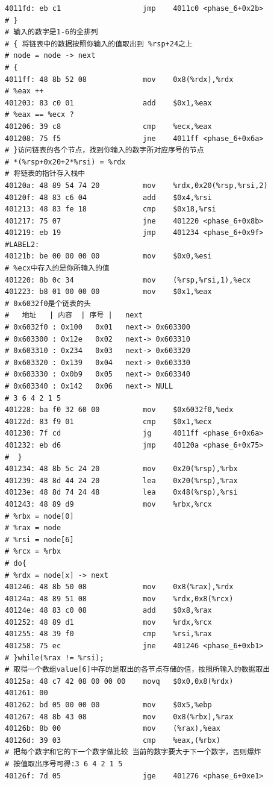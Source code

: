\begin{lstlisting}
4011fd:	eb c1                	jmp    4011c0 <phase_6+0x2b>
# } 
# 输入的数字是1-6的全排列
# { 将链表中的数据按照你输入的值取出到 %rsp+24之上
# node = node -> next
# {
4011ff:	48 8b 52 08          	mov    0x8(%rdx),%rdx
# %eax ++
401203:	83 c0 01             	add    $0x1,%eax
# %eax == %ecx ?
401206:	39 c8                	cmp    %ecx,%eax
401208:	75 f5                	jne    4011ff <phase_6+0x6a>
# }访问链表的各个节点，找到你输入的数字所对应序号的节点
# *(%rsp+0x20+2*%rsi) = %rdx
# 将链表的指针存入栈中
40120a:	48 89 54 74 20       	mov    %rdx,0x20(%rsp,%rsi,2)
40120f:	48 83 c6 04          	add    $0x4,%rsi
401213:	48 83 fe 18          	cmp    $0x18,%rsi
401217:	75 07                	jne    401220 <phase_6+0x8b>
401219:	eb 19                	jmp    401234 <phase_6+0x9f>
#LABEL2:
40121b:	be 00 00 00 00       	mov    $0x0,%esi
# %ecx中存入的是你所输入的值
401220:	8b 0c 34             	mov    (%rsp,%rsi,1),%ecx
401223:	b8 01 00 00 00       	mov    $0x1,%eax
# 0x6032f0是个链表的头
#   地址   | 内容  | 序号 |   next  
# 0x6032f0 : 0x100   0x01   next-> 0x603300
# 0x603300 : 0x12e   0x02   next-> 0x603310
# 0x603310 : 0x234   0x03   next-> 0x603320
# 0x603320 : 0x139   0x04   next-> 0x603330
# 0x603330 : 0x0b9   0x05   next-> 0x603340
# 0x603340 : 0x142   0x06   next-> NULL
# 3 6 4 2 1 5
401228:	ba f0 32 60 00       	mov    $0x6032f0,%edx
40122d:	83 f9 01             	cmp    $0x1,%ecx
401230:	7f cd                	jg     4011ff <phase_6+0x6a>
401232:	eb d6                	jmp    40120a <phase_6+0x75>
#  }
401234:	48 8b 5c 24 20       	mov    0x20(%rsp),%rbx
401239:	48 8d 44 24 20       	lea    0x20(%rsp),%rax
40123e:	48 8d 74 24 48       	lea    0x48(%rsp),%rsi
401243:	48 89 d9             	mov    %rbx,%rcx
# %rbx = node[0]
# %rax = node
# %rsi = node[6]
# %rcx = %rbx
# do{
# %rdx = node[x] -> next
401246:	48 8b 50 08          	mov    0x8(%rax),%rdx
40124a:	48 89 51 08          	mov    %rdx,0x8(%rcx)
40124e:	48 83 c0 08          	add    $0x8,%rax
401252:	48 89 d1             	mov    %rdx,%rcx
401255:	48 39 f0             	cmp    %rsi,%rax
401258:	75 ec                	jne    401246 <phase_6+0xb1>
# }while(%rax != %rsi);
# 取得一个数组value[6]中存的是取出的各节点存储的值，按照所输入的数据取出
40125a:	48 c7 42 08 00 00 00 	movq   $0x0,0x8(%rdx)
401261:	00 
401262:	bd 05 00 00 00       	mov    $0x5,%ebp
401267:	48 8b 43 08          	mov    0x8(%rbx),%rax
40126b:	8b 00                	mov    (%rax),%eax
40126d:	39 03                	cmp    %eax,(%rbx)
# 把每个数字和它的下一个数字做比较 当前的数字要大于下一个数字，否则爆炸
# 按值取出序号可得:3 6 4 2 1 5
40126f:	7d 05                	jge    401276 <phase_6+0xe1>

\end{lstlisting}
